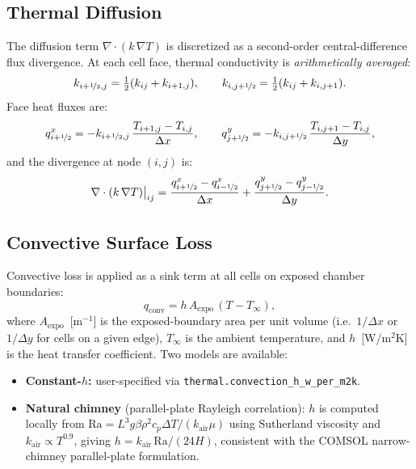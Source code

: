 \documentclass[11pt, letterpaper]{article}
\begin{document}
\subsection{Thermal Diffusion}

The diffusion term $\nabla\cdot(k\,\nabla T)$ is discretized as a
second-order central-difference flux divergence.
At each cell face, thermal conductivity is \emph{arithmetically averaged}:
%
\begin{equation}
  k_{i+\nicefrac{1}{2},j} = \tfrac{1}{2}(k_{ij}+k_{i+1,j}),\qquad
  k_{i,j+\nicefrac{1}{2}} = \tfrac{1}{2}(k_{ij}+k_{i,j+1}).
\end{equation}
%
Face heat fluxes are:
%
\begin{equation}
  q^x_{i+\nicefrac{1}{2}} = -k_{i+\nicefrac{1}{2},j}\,
    \frac{T_{i+1,j}-T_{i,j}}{\Delta x},\qquad
  q^y_{j+\nicefrac{1}{2}} = -k_{i,j+\nicefrac{1}{2}}\,
    \frac{T_{i,j+1}-T_{i,j}}{\Delta y},
\end{equation}
%
and the divergence at node $(i,j)$ is:
%
\begin{equation}
  \nabla\cdot(k\,\nabla T)\big|_{ij}
    = \frac{q^x_{i+\nicefrac{1}{2}}-q^x_{i-\nicefrac{1}{2}}}{\Delta x}
    + \frac{q^y_{j+\nicefrac{1}{2}}-q^y_{j-\nicefrac{1}{2}}}{\Delta y}.
\end{equation}

\subsection{Convective Surface Loss}

Convective loss is applied as a sink term at all cells on exposed chamber
boundaries:
%
\begin{equation}
  q_{\mathrm{conv}} = h\,A_{\mathrm{expo}}\,(T-T_\infty),
\end{equation}
%
where $A_{\mathrm{expo}}$~[m$^{-1}$] is the exposed-boundary area per unit
volume (i.e.\ $1/\Delta x$ or $1/\Delta y$ for cells on a given edge),
$T_\infty$ is the ambient temperature, and $h$~[W/m$^2$K] is the heat transfer
coefficient.
Two models are available:
\begin{itemize}[leftmargin=2em, itemsep=2pt]
  \item \textbf{Constant-$h$:} user-specified via \texttt{thermal.convection\_h\_w\_per\_m2k}.
  \item \textbf{Natural chimney} (parallel-plate Rayleigh correlation):
    $h$ is computed locally from
    $\mathrm{Ra} = L^3 g\beta\rho^2 c_p\Delta T/(k_{\mathrm{air}}\mu)$
    using Sutherland viscosity and $k_{\mathrm{air}}\propto T^{0.9}$,
    giving $h = k_{\mathrm{air}}\,\mathrm{Ra}/(24H)$, consistent with
    the COMSOL narrow-chimney parallel-plate formulation.
\end{itemize}
\end{document}
